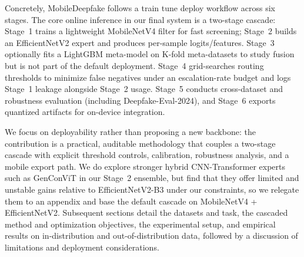 Concretely, MobileDeepfake follows a train\,\textrightarrow\,tune\,\textrightarrow\,deploy workflow across six stages. The core online inference in our final system is a two\hyp stage cascade: Stage~1 trains a lightweight MobileNetV4 filter for fast screening; Stage~2 builds an EfficientNetV2 expert and produces per\hyp sample logits/features. Stage~3 optionally fits a LightGBM meta\hyp model on K\hyp fold meta\hyp datasets to study fusion but is not part of the default deployment. Stage~4 grid\hyp searches routing thresholds to minimize false negatives under an escalation\hyp rate budget and logs Stage~1 leakage alongside Stage~2 usage. Stage~5 conducts cross\hyp dataset and robustness evaluation (including Deepfake\hyp Eval\hyp 2024), and Stage~6 exports quantized artifacts for on\hyp device integration.

We focus on deployability rather than proposing a new backbone: the contribution is a practical, auditable methodology that couples a two\hyp stage cascade with explicit threshold controls, calibration, robustness analysis, and a mobile export path. We do explore stronger hybrid CNN\hyp Transformer experts such as GenConViT in our Stage~2 ensemble, but find that they offer limited and unstable gains relative to EfficientNetV2\hyp B3 under our constraints, so we relegate them to an appendix and base the default cascade on MobileNetV4 + EfficientNetV2. Subsequent sections detail the datasets and task, the cascaded method and optimization objectives, the experimental setup, and empirical results on in\hyp distribution and out\hyp of\hyp distribution data, followed by a discussion of limitations and deployment considerations.
